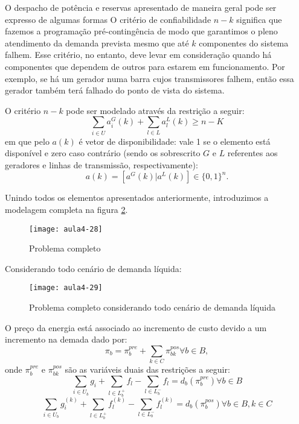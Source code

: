 O despacho de potência e reservas apresentado de maneira geral pode ser expresso de algumas formas
O critério de confiabilidade $n-k$ significa que fazemos a programação pré-contingência de modo que garantimos o pleno atendimento da demanda prevista mesmo que até $k$ componentes do sistema falhem. 
Esse critério, no entanto, deve levar em consideração quando há componentes que dependem de outros para estarem em funcionamento. Por exemplo, se há um gerador numa barra cujos transmissores falhem, então essa gerador também terá falhado do ponto de vista do sistema.

O critério $n-k$ pode ser modelado através da restrição a seguir: 
$$\sum_{i\in U}a_{i}^{G}(k)+\sum_{l\in L}a_{l}^{L}(k)\geq n-K$$
em que pelo $a(k)$ é vetor de disponibilidade: vale 1 se o elemento está disponível e zero caso contrário (sendo os sobrescrito $G$ e $L$ referentes aos geradores e linhas de transmissão, respectivamente):
$$a(k)=\left[a^{G}(k)|a^{L}(k)\right]\in\{0,1\}^{n}.$$

Unindo todos os elementos apresentados anteriormente, introduzimos a modelagem completa na figura \ref{fig:aula4-29}.
\begin{figure}[H]
\begin{centering}
\texttt{[image: aula4-28]}\protect\caption{\label{fig:aula4-28} Problema completo}
\end{centering}
\end{figure}
Considerando todo cenário de demanda líquida:
\begin{figure}[H]
\begin{centering}
\texttt{[image: aula4-29]}\protect\caption{\label{fig:aula4-29} Problema completo considerando todo cenário de demanda líquida}
\end{centering}
\end{figure}


O preço da energia está associado ao incremento de custo devido a
um incremento na demada dado por:
\[
\pi_{b}=\pi_{b}^{pre}+\sum_{k\in C}\pi_{bk}^{pos}\forall b\in B,
\]
onde $\pi_{b}^{pre}$ e $\pi_{bk}^{pos}$ são as variáveis duais das
restrições a seguir:
\[
\sum_{i\in U_{b}}g_{i}+\sum_{l\in L_{b}^{+}}f_{l}-\sum_{l\in L_{b}^{-}}f_{l}=d_{b}(\pi_{b}^{pre})\forall b\in B
\]
\[
\sum_{i\in U_{b}}g_{i}^{(k)}+\sum_{l\in L_{b}^{+}}f_{l}^{(k)}-\sum_{l\in L_{b}^{-}}f_{l}^{(k)}=d_{b}(\pi_{b}^{pos})\forall b\in B,k\in C
\]

